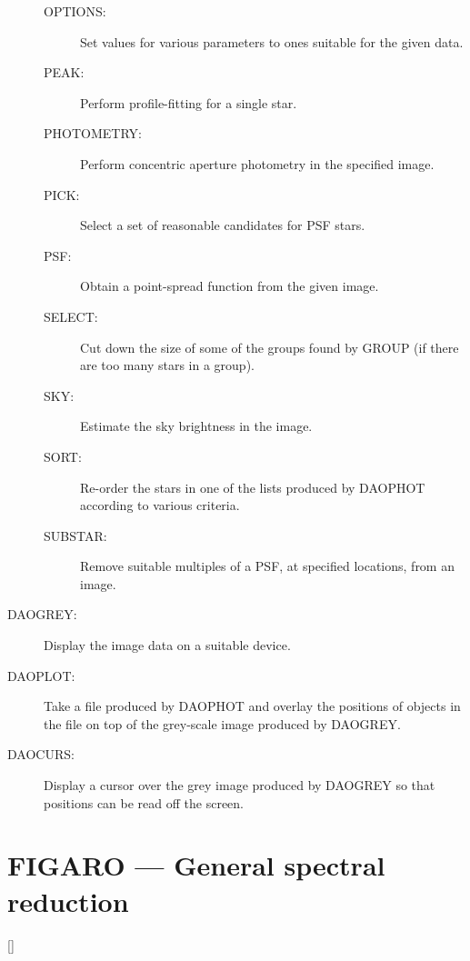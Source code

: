 \begin{description}
\begin{description}
\item [OPTIONS:]  Set values for various parameters to ones suitable for the
 given data.
\item [PEAK:]  Perform profile-fitting for a single star.
\item [PHOTOMETRY:]  Perform concentric aperture photometry in the specified
 image.
\item [PICK:]  Select a set of reasonable candidates for PSF stars.
\item [PSF:]  Obtain a point-spread function from the given image.
\item [SELECT:]  Cut down the size of some of the groups found by GROUP (if
 there are too many stars in a group).
\item [SKY:]  Estimate the sky brightness in the image.
\item [SORT:]  Re-order the stars in one of the lists produced by DAOPHOT
 according to various criteria.
\item [SUBSTAR:]  Remove suitable multiples of a PSF, at specified locations,
from an image.
\end{description}

\item [DAOGREY:]  Display the image data on a suitable device.

\item [DAOPLOT:]  Take a file produced by DAOPHOT and overlay the positions
 of objects in the file on top of the grey-scale image produced by DAOGREY.

\item [DAOCURS:]  Display a cursor over the grey image produced by DAOGREY so
 that positions can be read off the screen.
\end{description}

\newpage

\section{FIGARO --- General spectral reduction}

\vspace{-10mm}

\hfill []

\vspace{2mm}

